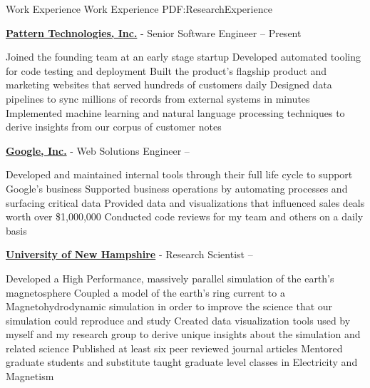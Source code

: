 \documentclass[letterpaper,MMMyyyy,nonstopmode]{simpleresumecv}
\begin{document}
\begin{Body}


\Section
{Work Experience}
{Work Experience}
{PDF:ResearchExperience}

\Entry
\href {https://getpattern.com}{\textbf{Pattern Technologies, Inc.}}
-
Senior Software Engineer
\hfill
{} -- Present

\Gap
\begin{Detail}
\BulletItem
Joined the founding team at an early stage startup
\BulletItem
Developed automated tooling for code testing and deployment
\BulletItem
Built the product's flagship product and
marketing websites that served hundreds of customers daily
\BulletItem
Designed data pipelines to sync millions of records from external systems in minutes
\BulletItem
Implemented machine learning and natural language processing techniques to derive insights from our corpus of customer notes
\end{Detail}


\BigGap
\Entry
\href {https://google.com}{\textbf{Google, Inc.}}
-
Web Solutions Engineer
\hfill
{} -- 

\Gap
\begin{Detail}
\BulletItem
Developed and maintained internal tools through their full life cycle to support Google's business
\BulletItem
Supported business operations by automating processes and surfacing critical data
\BulletItem
Provided data and visualizations that influenced sales deals worth over \$1,000,000
\BulletItem
Conducted code reviews for my team and others on a daily basis
\end{Detail}


\BigGap
\Entry
\href {http://www.unh.edu/}{\textbf{University of New Hampshire}}
-
Research Scientist
\hfill
{} -- 

\Gap
\begin{Detail}
\BulletItem
Developed a High Performance, massively parallel simulation of the earth's magnetosphere
\BulletItem
Coupled a model of the earth's ring current to a Magnetohydrodynamic simulation in order to improve the science that our simulation could reproduce and study
\BulletItem
Created data visualization tools used by myself and my research group to derive unique insights about the simulation and related science
\BulletItem
Published at least six peer reviewed journal articles
\BulletItem
Mentored graduate students and substitute taught graduate level classes in Electricity and Magnetism
\end{Detail}



\end{Body}
\end{document}
